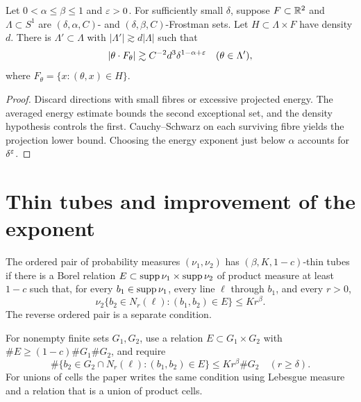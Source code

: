 \begin{theorem}
\label{thm:robust-kaufman}
Let $0<\alpha\leq\beta\leq1$ and $\varepsilon>0$.
For sufficiently small $\delta$, suppose $F\subset\mathbb{R}^2$ and
$\Lambda\subset S^1$ are $(\delta,\alpha,C)$- and
$(\delta,\beta,C)$-Frostman sets. Let $H\subset\Lambda\times F$
have density $d$. There is $\Lambda'\subset\Lambda$ with
$|\Lambda'|\gtrsim d|\Lambda|$ such that
\[
                 |\theta\cdot F_\theta|
                       \gtrsim C^{-2}d^3\delta^{1-\alpha+\varepsilon}
                 \quad(\theta\in\Lambda'),
\]
where $F_\theta=\{x:(\theta,x)\in H\}$.
\end{theorem}
\begin{proof}
Discard directions with small fibres or excessive projected energy.
The averaged energy estimate bounds the second exceptional set,
and the density hypothesis controls the first. Cauchy--Schwarz on
each surviving fibre yields the projection lower bound. Choosing
the energy exponent just below $\alpha$ accounts for $\delta^\varepsilon$.
\end{proof}

\section{Thin tubes and improvement of the exponent}

\begin{definition}
\label{def:thin-tubes}
\leanok
The ordered pair of probability measures $(\nu_1,\nu_2)$ has
$(\beta,K,1-c)$-thin tubes if there is a Borel relation
$E\subset\operatorname{supp}\nu_1\times\operatorname{supp}\nu_2$ of product measure at
least $1-c$ such that, for every $b_1\in\operatorname{supp}\nu_1$, every line
$\ell$ through $b_1$, and every $r>0$,
\[
          \nu_2\{b_2\in N_r(\ell):(b_1,b_2)\in E\}\leq Kr^\beta.
\]
The reverse ordered pair is a separate condition.
\end{definition}

\begin{definition}
\label{def:discrete-thin-tubes}
\leanok
For nonempty finite sets $G_1,G_2$, use a relation
$E\subset G_1\times G_2$ with
$\#E\geq(1-c)\#G_1\#G_2$, and require
\[
 \#\{b_2\in G_2\cap N_r(\ell):(b_1,b_2)\in E\}
                                  \leq Kr^\beta\#G_2
                                  \quad(r\geq\delta).
\]
For unions of cells the paper writes the same condition using
Lebesgue measure and a relation that is a union of product cells.
\end{definition}

